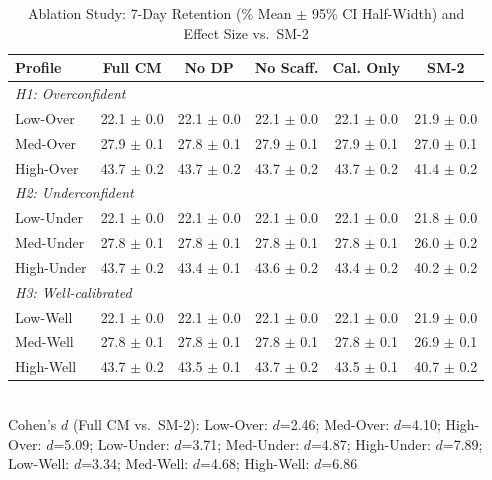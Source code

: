 \begin{table}[t]
\centering
\scriptsize
\setlength{\tabcolsep}{2.5pt}
\caption{Ablation Study: 7-Day Retention (\% Mean $\pm$ 95\% CI Half-Width) and Effect Size vs.\ SM-2}
\label{tab:ablation}
\begin{tabular}{lccccc}
\toprule
\textbf{Profile} & \textbf{Full CM} & \textbf{No DP} & \textbf{No Scaff.} & \textbf{Cal. Only} & \textbf{SM-2} \\
\midrule
\multicolumn{6}{l}{\textit{H1: Overconfident}} \\
Low-Over & 22.1 $\pm$ 0.0 & 22.1 $\pm$ 0.0 & 22.1 $\pm$ 0.0 & 22.1 $\pm$ 0.0 & 21.9 $\pm$ 0.0 \\
Med-Over & 27.9 $\pm$ 0.1 & 27.8 $\pm$ 0.1 & 27.9 $\pm$ 0.1 & 27.9 $\pm$ 0.1 & 27.0 $\pm$ 0.1 \\
High-Over & 43.7 $\pm$ 0.2 & 43.7 $\pm$ 0.2 & 43.7 $\pm$ 0.2 & 43.7 $\pm$ 0.2 & 41.4 $\pm$ 0.2 \\
\midrule
\multicolumn{6}{l}{\textit{H2: Underconfident}} \\
Low-Under & 22.1 $\pm$ 0.0 & 22.1 $\pm$ 0.0 & 22.1 $\pm$ 0.0 & 22.1 $\pm$ 0.0 & 21.8 $\pm$ 0.0 \\
Med-Under & 27.8 $\pm$ 0.1 & 27.8 $\pm$ 0.1 & 27.8 $\pm$ 0.1 & 27.8 $\pm$ 0.1 & 26.0 $\pm$ 0.2 \\
High-Under & 43.7 $\pm$ 0.2 & 43.4 $\pm$ 0.1 & 43.6 $\pm$ 0.2 & 43.4 $\pm$ 0.2 & 40.2 $\pm$ 0.2 \\
\midrule
\multicolumn{6}{l}{\textit{H3: Well-calibrated}} \\
Low-Well & 22.1 $\pm$ 0.0 & 22.1 $\pm$ 0.0 & 22.1 $\pm$ 0.0 & 22.1 $\pm$ 0.0 & 21.9 $\pm$ 0.0 \\
Med-Well & 27.8 $\pm$ 0.1 & 27.8 $\pm$ 0.1 & 27.8 $\pm$ 0.1 & 27.8 $\pm$ 0.1 & 26.9 $\pm$ 0.1 \\
High-Well & 43.7 $\pm$ 0.2 & 43.5 $\pm$ 0.1 & 43.7 $\pm$ 0.2 & 43.5 $\pm$ 0.1 & 40.7 $\pm$ 0.2 \\
\bottomrule
\end{tabular}
\\[4pt]
{\tiny Cohen's $d$ (Full CM vs.\ SM-2): Low-Over: $d$=2.46; Med-Over: $d$=4.10; High-Over: $d$=5.09; Low-Under: $d$=3.71; Med-Under: $d$=4.87; High-Under: $d$=7.89; Low-Well: $d$=3.34; Med-Well: $d$=4.68; High-Well: $d$=6.86}
\end{table}
